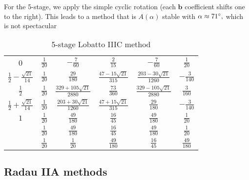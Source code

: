 \documentclass[10pt,a4paper]{article}
\newcommand{\half}[0]{\frac{1}{2}}
\newcommand{\bvec}[1]{\mathbf{#1}}
\begin{document}
\begin{appendix}
For the 5-stage, we apply the simple cyclic rotation (each $\bvec{b}$ coefficient shifts one to the right). This leads to a method that is $A(\alpha)$ stable with $\alpha\approx 71\degree,$ which is not spectacular
  \begin{table}[h]
    \centering
    \caption{5-stage Lobatto IIIC method}
    \def\arraystretch{1.5}%
  \begin{tabular}{c|ccccc}
    0                             & $\frac{1}{20}$ & $-\frac{7}{60}$ & $\frac{2}{15}$ & $-\frac{7}{60}$ & $\frac{1}{20}$ \\
    $\half - \frac{\sqrt{21}}{14}$ & $\frac{1}{20}$ & $\frac{29}{180}$ & $\frac{47-15\sqrt{21}}{315}$ & $\frac{203-30\sqrt{21}}{1260}$ & $-\frac{3}{140}$ \\
    $\half$ & $\frac{1}{20}$ & $\frac{329+105\sqrt{21}}{2880}$ & $\frac{73}{360}$ & $\frac{329-105\sqrt{21}}{2880}$ & $\frac{3}{160}$ \\
    $\half + \frac{\sqrt{21}}{14}$ & $\frac{1}{20}$ & $\frac{203+30\sqrt{21}}{1260}$ & $\frac{47+15\sqrt{21}}{315}$ & $\frac{29}{180} $ & $-\frac{3}{140}$ \\
    $1$ & $\frac{1}{20}$ & $\frac{49}{180}$ & $\frac{16}{45}$ & $\frac{49}{180}$ & $\frac{1}{20}$ \\ \hline
    {} & $\frac{1}{20}$ & $\frac{49}{180}$ & $\frac{16}{45}$ & $\frac{49}{180}$ & $\frac{1}{20}$ \\
    {} & $\frac{1}{20}$ & $\frac{1}{20}$ & $\frac{49}{180}$ & $\frac{16}{45}$ & $\frac{49}{180}$
  \end{tabular}
\end{table}

  \subsection{Radau IIA methods}
\end{appendix}
\end{document}
